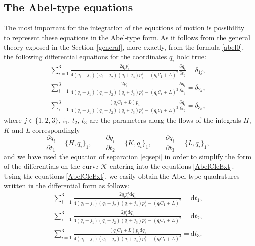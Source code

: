 \documentclass[10pt,a4paper]{amsart}
\def\d{\delta}
\numberwithin{equation}{section}
\begin{document}
\subsection{The Abel-type equations}
The most important for the integration of the equations of motion is possibility to represent these equations in the Abel-type form.
As it follows from the general theory exposed in the Section~\ref{general}, more exactly, from the formula \eqref{abel0}, the following differential equations for the coordinates $q_i$ hold true:
\begin{subequations}\label{AbelCleExt}
\begin{gather}
\sum\limits_{i=1}^3 \frac{2 q_i p_i^3 }{ 4 (q_i+j_1) (q_i+j_2)(q_i+j_3) p^4_i-(q_i C_1+L)^2}\frac{ \partial q_i}{\partial t_j} = \d_{1j},
\\
\sum\limits_{i=1}^3 \frac{2 p_i^3 }{ 4 (q_i+j_1) (q_i+j_2)(q_i+j_3) p^4_i-(q_i C_1+L)^2} \frac{ \partial q_i}{\partial t_j} = \d_{2j},
\\
\sum\limits_{i=1}^3 \frac{ (q_i C_1+L) p_i }{ 4 (q_i+j_1) (q_i+j_2)(q_i+j_3) p^4_i-(q_i C_1+L)^2}\frac{ \partial q_i}{\partial t_j} = \d_{3j},
\end{gather}
\end{subequations}
 where $j\in \{1,2,3\}$, $t_1$, $t_2$, $t_3$ are the parameters along the flows of the integrals $H$, $K$ and $L$ correspondingly
\[
\frac{\partial q_i}{\partial t_1}=\{H,q_i\}_1, \qquad \frac{\partial q_i}{\partial t_2}=\{K,q_i\}_1, \qquad \frac{\partial q_i}{\partial t_3}=\{L,q_i\}_1,
\]
and we have used the equation of separation \eqref{eqsepi} in order to simplify the form of the differentials on the curve $\mathcal{K}$ entering into the equations \eqref{AbelCleExt}. Using the equations \eqref{AbelCleExt}, we easily obtain the Abel-type quadratures written in the differential form as follows:
\begin{subequations}\label{AbelCleExt'}
\begin{gather}
\sum\limits_{i=1}^3 \frac{2 q_i p_i^3 \mathrm{d}q_i}{ 4 (q_i+j_1) (q_i+j_2)(q_i+j_3) p^4_i-(q_i C_1+L)^2} = \mathrm{d} t_1,
\\
\sum\limits_{i=1}^3 \frac{2 p_i^3 \mathrm{d} q_i}{ 4 (q_i+j_1) (q_i+j_2)(q_i+j_3) p^4_i-(q_i C_1+L)^2} = \mathrm{d} t_2,
\\
\sum\limits_{i=1}^3 \frac{ (q_i C_1+L) p_i \mathrm{d} q_i}{ 4 (q_i+j_1) (q_i+j_2)(q_i+j_3) p^4_i-(q_i C_1+L)^2} = \mathrm{d} t_3.
\end{gather}
\end{subequations}
\end{document}
